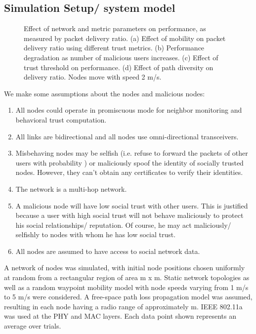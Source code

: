 \documentclass[conference]{IEEEtran}
\begin{document}
\subsection{Simulation Setup/ system model}
\label{subsec:simul_setup}

\begin{figure*}[ht]
\centering

\caption{Effect of network and metric parameters on performance, as measured by packet delivery ratio. (a) Effect of mobility on packet delivery ratio using different trust metrics. (b) Performance degradation as number of malicious users increases.  (c) Effect of trust threshold on performance. (d) Effect of path diversity on delivery ratio.  Nodes move with speed 2 m/s. }\label{fig:parameters}
\end{figure*}
We make some assumptions about the nodes and malicious nodes:
\begin{enumerate}
\item All nodes could operate in promiscuous mode for neighbor monitoring and behavioral trust computation.
\item All links are bidirectional and all nodes use omni-directional transceivers.
\item Misbehaving nodes may be selfish (i.e. refuse to forward the packets of other users with probability ) or maliciously spoof the identity of socially trusted nodes. However, they can't obtain any certificates to verify their identities.
\item The network is a multi-hop network.
\item A malicious node will have low social trust with other users. This is justified because a user with high social trust will not behave maliciously to protect his social relationships/ reputation. Of course, he may act maliciously/ selfishly to nodes with whom he has low social trust.
\item All nodes are assumed to have access to social network data.
\end{enumerate}

A network of  nodes was simulated, with initial node positions chosen uniformly at random from a rectangular region of area m x m.  Static network topologies as well as a random waypoint mobility model with node speeds varying from 1 m/s to 5 m/s were considered.  A free-space path loss propagation model was assumed, resulting in each node having a radio range of approximately m.  IEEE 802.11a was used at the PHY and MAC layers.  Each data point shown represents an average over  trials.
\end{document}
